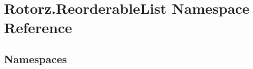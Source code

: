 \hypertarget{namespace_rotorz_1_1_reorderable_list}{}\section{Rotorz.\+Reorderable\+List Namespace Reference}
\label{namespace_rotorz_1_1_reorderable_list}
\subsection*{Namespaces}
\begin{DoxyCompactItemize}
\end{DoxyCompactItemize}
